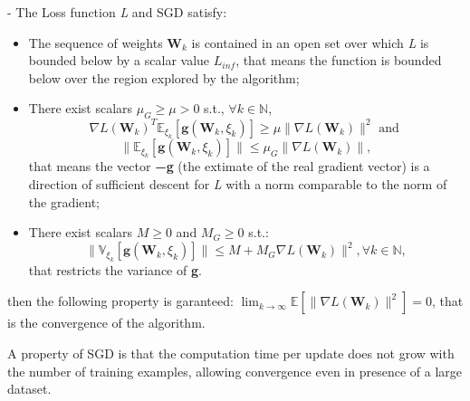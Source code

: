 		\begin{asu} - \label{as:sgd_conv2}
				The Loss function \textit{L} and SGD satisfy:

				\begin{itemize}
					\item The sequence of weights ${\textbf{W}_k}$ is contained in an open set over which \textit{L} is bounded below by a scalar value $\textit{L}_{inf}$, that means the function is bounded below over the region explored by the algorithm;
					\item There exist scalars $\mu_G \geq \mu > 0 $ s.t., $\forall k \in \mathbb{N}$,
						\begin{equation}
							\nabla\textit{L}(\textbf{W}_k)^T\mathbb{E}_{\xi_k}[\textbf{g}(\textbf{W}_k,\xi_k)] \geq \mu \|\nabla\textit{L}(\textbf{W}_k)\|^2 \text{ and }
						\end{equation}
						\begin{equation}
							\|\mathbb{E}_{\xi_k}[\textbf{g}(\textbf{W}_k,\xi_k)]\|\leq \mu_G \|\nabla\textit{L}(\textbf{W}_k)\|,
						\end{equation}
						that means the vector \textbf{−g} (the extimate of the real gradient vector) is a direction of sufficient descent for \textit{L} with a norm comparable to the norm of the gradient;
					\item There exist scalars $M \geq 0 $ and $M_G \geq 0 $ s.t.:
						\begin{equation}
							\|\mathbb{V}_{\xi_k}[\textbf{g}(\textbf{W}_k,\xi_k)]\|\leq M + M_G\nabla\textit{L}(\textbf{W}_k)\|^2, \forall  k \in \mathbb{N},
						\end{equation}
						that restricts the variance of \textbf{g}.
				\end{itemize}

		\end{asu}

		then the following property is garanteed:
			$\lim_{k\to\infty}\mathbb{E}[\|\nabla\textit{L}(\textbf{W}_k)\|^2] = 0$,
		that is the convergence of the algorithm.

		A property of SGD is that the computation time per update does not grow with the number of training examples, allowing convergence even in presence of a large dataset.

